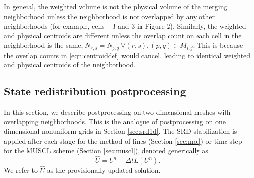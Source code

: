 In general, the weighted volume is not the physical volume of 
the merging neighborhood 
unless the neighborhood  is not overlapped by any other neighborhoods 
(for example, cells $-3$ and $3$ in Figure 2).  Similarly, the weighted and physical 
centroids are different unless the overlap count on each cell in the neighborhood is the 
same, $N_{r,s} = N_{p,q} ~ \forall (r,s), (p,q) \in M_{i,j} $.  
This is because the overlap counts in \eqref{eqn:centroiddef} would cancel, leading to identical  weighted and physical 
centroids of the neighborhood.







\subsection{State redistribution postprocessing} \label{sec:srd_postprocessing}


In this section, we describe postprocessing on two-dimensional meshes with overlapping neighborhoods.
This is the analogue of postprocessing on one dimensional nonuniform grids in Section \ref{sec:srd1d}.
The SRD stabilization is applied after each stage for the method of lines (Section \ref{sec:mol}) 
or time step for the MUSCL scheme (Section \ref{sec:muscl}), denoted generically as
\begin{equation} \label{eq:stage_step}
\widehat{U} = U^n + \Delta t  L(U^n).
\end{equation}
We refer to
$\widehat{U}$ as the provisionally updated solution.


